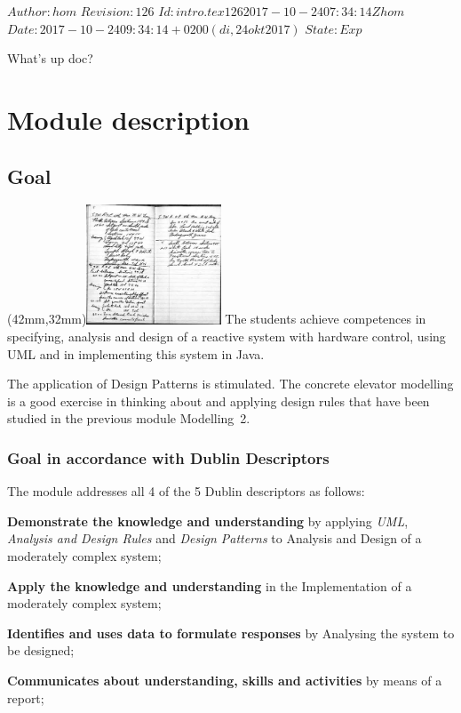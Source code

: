 \renewcommand\TheFile{intro.tex}
\SVN $Author: hom $
\SVN $Revision: 126 $
\SVN $Id: intro.tex 126 2017-10-24 07:34:14Z hom $
\SVN $Date: 2017-10-24 09:34:14 +0200 (di, 24 okt 2017) $
\SVN $State: Exp $

\begin{savequote}[8cm]
  \sffamily
  What's up doc?
\end{savequote}
\chapter{Module description}
\section{Goal}
\parpic(42mm,32mm){\includegraphics[width=40mm]{figures/INT082E06-description4.jpg}}
The students achieve competences in specifying, analysis and design of
a reactive system with hardware control, using UML and in implementing
this system in Java.

The application of Design Patterns is stimulated. The concrete
elevator modelling is a good exercise in thinking about and applying
design rules that have been studied in the previous module Modelling~2.

\subsection{Goal in accordance with Dublin Descriptors}
The module addresses all 4 of the 5 Dublin descriptors as follows:
\begin{Itemize}
\item \textbf{Demonstrate the knowledge and understanding} by applying
  \textit{UML}, \textit{Analysis and Design Rules} and \textit{Design
    Patterns} to Analysis and Design of a moderately complex system; 
\item \textbf{Apply the knowledge and understanding} in the
    Implementation of a moderately complex system;
  \item \textbf{Identifies and uses data to formulate responses} by
    Analysing the system to be designed;
  \item \textbf{Communicates about understanding, skills and
      activities} by means of a report;
\end{Itemize}

